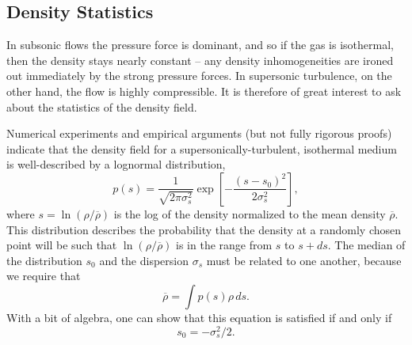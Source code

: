 \subsection{Density Statistics}

In subsonic flows the pressure force is dominant, and so if the gas is isothermal, then the density stays nearly constant -- any density inhomogeneities are ironed out immediately by the strong pressure forces. In supersonic turbulence, on the other hand, the flow is highly compressible. It is therefore of great interest to ask about the statistics of the density field.

Numerical experiments and empirical arguments (but not fully rigorous proofs) indicate that the density field for a supersonically-turbulent, isothermal medium is well-described by a lognormal distribution,
\begin{equation}
\label{eq:denpdf}
p(s) = \frac{1}{\sqrt{2\pi \sigma_s^2}} \exp\left[-\frac{(s-s_0)^2}{2\sigma_s^2}\right],
\end{equation}
where $s=\ln(\rho/\overline{\rho})$ is the log of the density normalized to the mean density $\overline{\rho}$. This distribution describes the probability that the density at a randomly chosen point will be such that $\ln(\rho/\overline{\rho})$ is in the range from $s$ to $s+ds$. The median of the distribution $s_0$ and the dispersion $\sigma_s$ must be related to one another, because we require that
\begin{equation}
\overline{\rho} = \int p(s) \rho \, ds.
\end{equation}
With a bit of algebra, one can show that this equation is satisfied if and only if
\begin{equation}
s_0 = -\sigma_s^2/2.
\end{equation}


